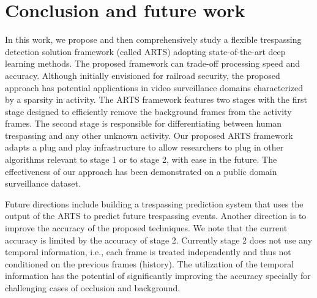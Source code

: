 \section{Conclusion and future work}
\label{sec:conclusion}
In this work, we propose and then comprehensively study a flexible trespassing detection solution framework (called ARTS) adopting state-of-the-art deep learning methods. The proposed framework can trade-off processing speed and accuracy. Although initially envisioned for railroad security, the proposed approach has potential applications in video surveillance domains characterized by a sparsity in activity.  The ARTS framework features two stages with the first stage designed to efficiently remove the background frames from the activity frames. The second stage is responsible for differentiating between human trespassing and any other unknown activity. Our proposed ARTS framework adapts a plug and play infrastructure to allow researchers to plug in other algorithms relevant to stage 1 or to stage 2, with ease in the future. The effectiveness of our approach has been demonstrated on a public domain surveillance dataset. 

Future directions include building a trespassing prediction system that uses the output of the ARTS to predict future trespassing events. Another direction is to improve the accuracy of the proposed techniques. We note that the current accuracy is limited by the accuracy of stage 2. Currently stage 2 does not use any temporal information, i.e., each frame is treated independently and thus not conditioned on the previous frames (history). The utilization of the temporal information has the potential of significantly improving the accuracy specially for challenging cases of occlusion and background.
